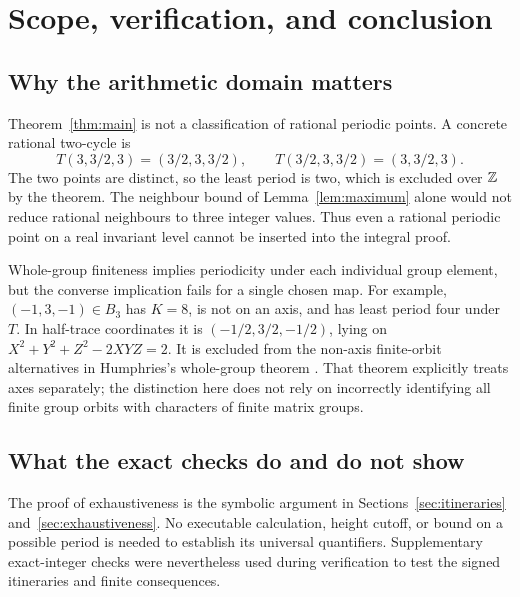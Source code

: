 \section{Scope, verification, and conclusion}\label{sec:scope}

\subsection{Why the arithmetic domain matters}

Theorem~\ref{thm:main} is not a classification of rational periodic
points. A concrete rational two-cycle is
\begin{equation}\label{eq:rational-example}
 T(3,3/2,3)=(3/2,3,3/2),\qquad
 T(3/2,3,3/2)=(3,3/2,3).
\end{equation}
The two points are distinct, so the least period is two, which is
excluded over $\mathbb Z$ by the theorem. The neighbour bound of
Lemma~\ref{lem:maximum} alone would not reduce rational neighbours
to three integer values. Thus even a rational periodic point on a
real invariant level cannot be inserted into the integral proof.

Whole-group finiteness implies periodicity under each individual group
element, but the converse implication fails for a single chosen map. For
example, $(-1,3,-1)\in B_3$ has $K=8$, is not on an axis, and
has least period four under $T$. In half-trace coordinates it is
$(-1/2,3/2,-1/2)$, lying on
$X^2+Y^2+Z^2-2XYZ=2$. It is excluded from the non-axis finite-orbit alternatives
in Humphries's whole-group theorem
\citep[Theorem~1 and its proof]{humphries2016finite}.
That theorem explicitly treats axes separately; the distinction here
does not rely on incorrectly identifying all finite group orbits
with characters of finite matrix groups.

\subsection{What the exact checks do and do not show}

The proof of exhaustiveness is the symbolic argument in
Sections~\ref{sec:itineraries} and~\ref{sec:exhaustiveness}.
No executable calculation, height cutoff, or bound on a possible
period is needed to establish its universal quantifiers. Supplementary
exact-integer checks were nevertheless used during verification to
test the signed itineraries and finite consequences.

